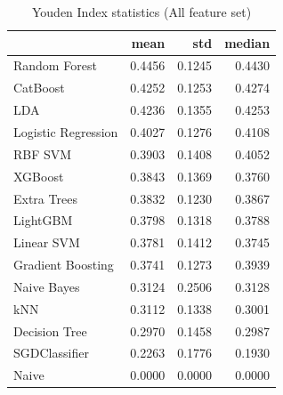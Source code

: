 \begin{table}
\caption{Youden Index statistics (All feature set)}
\label{tab:youden_All_stats}
\begin{tabular}{lrrr}
\toprule
 & mean & std & median \\
\midrule
Random Forest & 0.4456 & 0.1245 & 0.4430 \\
CatBoost & 0.4252 & 0.1253 & 0.4274 \\
LDA & 0.4236 & 0.1355 & 0.4253 \\
Logistic Regression & 0.4027 & 0.1276 & 0.4108 \\
RBF SVM & 0.3903 & 0.1408 & 0.4052 \\
XGBoost & 0.3843 & 0.1369 & 0.3760 \\
Extra Trees & 0.3832 & 0.1230 & 0.3867 \\
LightGBM & 0.3798 & 0.1318 & 0.3788 \\
Linear SVM & 0.3781 & 0.1412 & 0.3745 \\
Gradient Boosting & 0.3741 & 0.1273 & 0.3939 \\
Naive Bayes & 0.3124 & 0.2506 & 0.3128 \\
kNN & 0.3112 & 0.1338 & 0.3001 \\
Decision Tree & 0.2970 & 0.1458 & 0.2987 \\
SGDClassifier & 0.2263 & 0.1776 & 0.1930 \\
Naive & 0.0000 & 0.0000 & 0.0000 \\
\bottomrule
\end{tabular}
\end{table}
